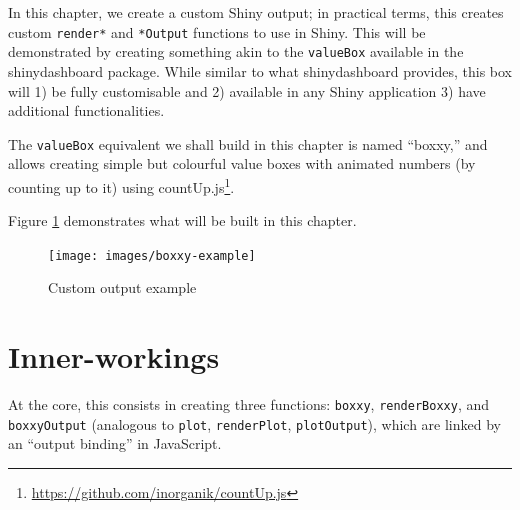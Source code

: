 \documentclass[10pt,]{krantz}
\makeatletter
\newenvironment{Shaded}{\begin{snugshade}}{\end{snugshade}}
\newcommand{\ControlFlowTok}[1]{\textcolor[rgb]{0.27,0.27,0.27}{\textbf{#1}}}
\newcommand{\DecValTok}[1]{\textcolor[rgb]{0.06,0.06,0.06}{#1}}
\newcommand{\KeywordTok}[1]{\textcolor[rgb]{0.27,0.27,0.27}{\textbf{#1}}}
\newcommand{\NormalTok}[1]{#1}
\newcommand{\OperatorTok}[1]{\textcolor[rgb]{0.43,0.43,0.43}{\textbf{#1}}}
\newcommand{\StringTok}[1]{\textcolor[rgb]{0.5,0.5,0.5}{#1}}
\renewcommand{\href}[2]{#2\footnote{\url{#1}}}
\newenvironment{kframe}{%
\medskip{}
\setlength{\fboxsep}{.8em}
 \def\at@end@of@kframe{}%
 \ifinner\ifhmode%
  \def\at@end@of@kframe{\end{minipage}}%
  \begin{minipage}{\columnwidth}%
 \fi\fi%
 \def\FrameCommand##1{\hskip\@totalleftmargin \hskip-\fboxsep
 \colorbox{shadecolor}{##1}\hskip-\fboxsep
     \hskip-\linewidth \hskip-\@totalleftmargin \hskip\columnwidth}%
 \MakeFramed {\advance\hsize-\width
   \@totalleftmargin\z@ \linewidth\hsize
   \@setminipage}}%
 {\par\unskip\endMakeFramed%
 \at@end@of@kframe}
\renewenvironment{Shaded}{\begin{kframe}}{\end{kframe}}
\makeatother
\begin{document}
In this chapter, we create a custom Shiny output; in practical terms, this creates custom \texttt{render*} and \texttt{*Output} functions to use in Shiny. This will be demonstrated by creating something akin to the \texttt{valueBox} available in the shinydashboard \citep{R-shinydashboard} package. While similar to what shinydashboard provides, this box will 1) be fully customisable and 2) available in any Shiny application 3) have additional functionalities.

The \texttt{valueBox} equivalent we shall build in this chapter is named ``boxxy,'' and allows creating simple but colourful value boxes with animated numbers (by counting up to it) using \href{https://github.com/inorganik/countUp.js}{countUp.js}.

Figure \ref{fig:boxxy-example} demonstrates what will be built in this chapter.

\begin{Shaded}
\end{Shaded}

\begin{figure}[H]

{\centering \texttt{[image: images/boxxy-example]} 

}

\caption{Custom output example}\label{fig:boxxy-example}
\end{figure}

\hypertarget{shiny-output-inner-workings}{%
\section{Inner-workings}\label{shiny-output-inner-workings}}

At the core, this consists in creating three functions: \texttt{boxxy}, \texttt{renderBoxxy}, and \texttt{boxxyOutput} (analogous to \texttt{plot}, \texttt{renderPlot}, \texttt{plotOutput}), which are linked by an ``output binding'' in JavaScript.
\end{document}
